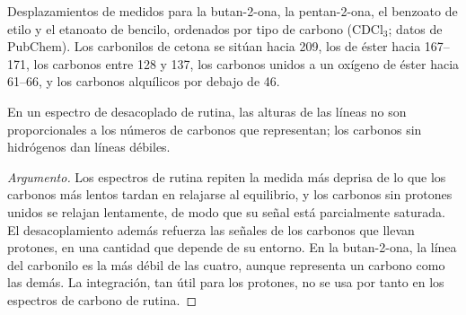 \begin{omfigure}

{\small Desplazamientos de  medidos para la butan-2-ona, la pentan-2-ona, el benzoato de etilo y el etanoato de bencilo,
ordenados por tipo de carbono (CDCl$_3$; datos de PubChem). Los carbonilos de cetona se sitúan hacia 209, los de éster hacia
167--171, los carbonos  entre 128 y 137, los carbonos unidos a un oxígeno de éster hacia 61--66, y los
carbonos alquílicos por debajo de 46.}
\end{omfigure}

\begin{proposition}\label{prop:b2:structure-determination:intensities}
En un espectro de  desacoplado de rutina, las alturas de las líneas no son proporcionales a los
números de carbonos que representan; los carbonos sin hidrógenos dan líneas débiles.
\end{proposition}

\begin{proof}[Argumento]
Los espectros de rutina repiten la medida más deprisa de lo que los carbonos más lentos tardan en relajarse al equilibrio, y
los carbonos sin protones unidos se relajan lentamente, de modo que su señal está parcialmente saturada. El desacoplamiento además
refuerza las señales de los carbonos que llevan protones, en una cantidad que depende de su entorno.
En la butan-2-ona, la línea del carbonilo es la más débil de las cuatro, aunque representa un carbono como
las demás. La integración, tan útil para los protones, no se usa por tanto en los espectros de carbono de rutina.
\end{proof}

